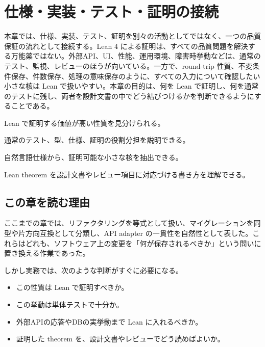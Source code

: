 \chapter{仕様・実装・テスト・証明の接続}
\label{chap:spec-impl-test-proof}

\begin{chapterabstract}
本章では、仕様、実装、テスト、証明を別々の活動としてではなく、一つの品質保証の流れとして接続する。Lean 4 による証明は、すべての品質問題を解決する万能薬ではない。外部API、UI、性能、運用環境、障害時挙動などは、通常のテスト、監視、レビューのほうが向いている。一方で、round-trip 性質、不変条件保存、件数保存、処理の意味保存のように、すべての入力について確認したい小さな核は Lean で扱いやすい。本章の目的は、何を Lean で証明し、何を通常のテストに残し、両者を設計文書の中でどう結びつけるかを判断できるようにすることである。
\end{chapterabstract}

\begin{learninggoals}
\item Lean で証明する価値が高い性質を見分けられる。
\item 通常のテスト、型、仕様、証明の役割分担を説明できる。
\item 自然言語仕様から、証明可能な小さな核を抽出できる。
\item Lean theorem を設計文書やレビュー項目に対応づける書き方を理解できる。
\end{learninggoals}

\section{この章を読む理由}

ここまでの章では、リファクタリングを等式として扱い、マイグレーションを同型や片方向互換として分類し、API adapter の一貫性を自然性として表した。これらはどれも、ソフトウェア上の変更を「何が保存されるべきか」という問いに置き換える作業であった。

しかし実務では、次のような判断がすぐに必要になる。

\begin{itemize}
\item この性質は Lean で証明すべきか。
\item この挙動は単体テストで十分か。
\item 外部APIの応答やDBの実挙動まで Lean に入れるべきか。
\item 証明した theorem を、設計文書やレビューでどう読めばよいか。
\end{itemize}

